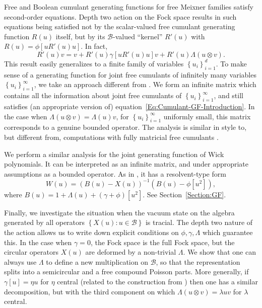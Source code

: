 \documentclass[12pt]{amsart}
\theoremstyle{definition}
\newcommand{\set}[1]{\left\{#1\right\}}
\newcommand{\mc}[1]{\mathcal{#1}}
\begin{document}
Free and Boolean cumulant generating functions for free Meixner families \cite{Boz-Bryc,AnsFree-Meixner} satisfy second-order equations. Depth two action on the Fock space results in such equations being satisfied not by the scalar-valued free cumulant generating function $R(u)$ itself, but by its $\mc{B}$-valued ``kernel'' $R'(u)$ with $R(u) = \phi[u R'(u) u]$. In fact,
\begin{equation}
\label{Eq:Cumulant-GF-Introduction}
	R'(u) v = v + R'(u) \gamma\left[ u R'(u) u \right] v + R'(u) \Lambda(u \otimes v).
	\end{equation}
This result easily generalizes to a finite family of variables $\set{u_i}_{i=1}^d$. To make sense of a generating function for joint free cumulants of infinitely many variables $\set{u_i}_{i=1}^\infty$, we take an approach different from \cite{Bozejko-Lytvynov-Meixner-II}. We form an infinite matrix which contains all the information about joint free cumulants of $\set{u_i}_{i=1}^\infty$, and still satisfies (an appropriate version of) equation~\eqref{Eq:Cumulant-GF-Introduction}. In the case when $\Lambda(u \otimes v) = \Lambda(u) v$, for $\set{u_i}_{i=1}^\infty$ uniformly small, this matrix corresponds to a genuine bounded operator. The analysis is similar in style to, but different from, computations with fully matricial free cumulants \cite{Popa-Vinnikov-NC-functions}.

We perform a similar analysis for the joint generating function of Wick polynomials. It can be interpreted as an infinite matrix, and under appropriate assumptions as a bounded operator. As in \cite{AnsFree-Meixner,Bozejko-Lytvynov-Meixner-II}, it has a resolvent-type form
\[
W(u) = (B(u) - X(u))^{-1}(B(u) - \phi[u^2]),
\]
where $B(u) = 1 + \Lambda(u) + (\gamma + \phi)[u^2]$. See Section~\ref{Section:GF}.

Finally, we investigate the situation when the vacuum state on the algebra generated by all operators $\set{X(u) : u \in \mc{B}}$ is tracial. The depth two nature of the action allows us to write down explicit conditions on $\phi, \gamma, \Lambda$ which guarantee this. In the case when $\gamma = 0$, the Fock space is the full Fock space, but the circular operators $X(u)$ are deformed by a non-trivial $\Lambda$. We show that one can always use $\Lambda$ to define a new multiplication on $\mc{B}$, so that the representation splits into a semicircular and a free compound Poisson parts. More generally, if $\gamma[u] = \eta u$ for $\eta$ central (related to the construction from \cite{Bozejko-Lytvynov-Meixner-I}) then one has a similar decomposition, but with the third component on which $\Lambda(u \otimes v) = \lambda u v$ for $\lambda$ central.
\end{document}
